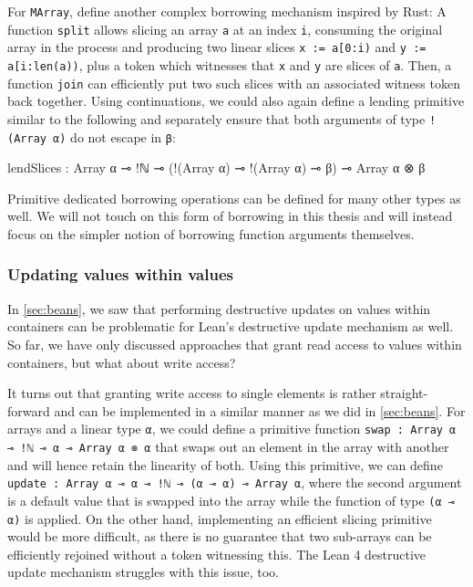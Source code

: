 For \lstinline|MArray|, \cite{spiwack_linearly_2022} define another complex borrowing mechanism inspired by Rust: A function \lstinline|split| allows slicing an array \lstinline|a| at an index \lstinline|i|, consuming the original array in the process and producing two linear slices \lstinline|x := a[0:i)| and \lstinline|y := a[i:len(a))|, plus a token which witnesses that \lstinline|x| and \lstinline|y| are slices of \lstinline|a|. Then, a function \lstinline|join| can efficiently put two such slices with an associated witness token back together. Using continuations, we could also again define a lending primitive similar to the following and separately ensure that both arguments of type \lstinline|!(Array α)| do not escape in \lstinline|β|:\\
\begin{code}
lendSlices : Array α ⊸ !ℕ ⊸ (!(Array α) ⊸ !(Array α) ⊸ β) 
  ⊸ Array α ⊗ β
\end{code}

Primitive dedicated borrowing operations can be defined for many other types as well. We will not touch on this form of borrowing in this thesis and will instead focus on the simpler notion of borrowing function arguments themselves.

\subsubsection{Updating values within values}
In \cref{sec:beans}, we saw that performing destructive updates on values within containers can be problematic for Lean's destructive update mechanism as well. So far, we have only discussed approaches that grant read access to values within containers, but what about write access?

It turns out that granting write access to single elements is rather straight-forward and can be implemented in a similar manner as we did in \cref{sec:beans}. For arrays and a linear type \lstinline|α|, we could define a primitive function \lstinline|swap : Array α ⊸ !ℕ ⊸ α ⊸ Array α ⊗ α| that swaps out an element in the array with another and will hence retain the linearity of both. Using this primitive, we can define \lstinline|update : Array α ⊸ α ⊸ !ℕ ⊸ (α ⊸ α) ⊸ Array α|, where the second argument is a default value that is swapped into the array while the function of type \lstinline|(α ⊸ α)| is applied. On the other hand, implementing an efficient slicing primitive would be more difficult, as there is no guarantee that two sub-arrays can be efficiently rejoined without a token witnessing this. The Lean 4 destructive update mechanism struggles with this issue, too.